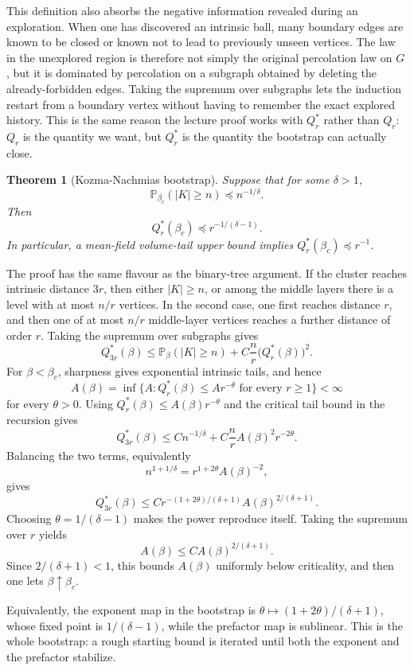 \documentclass[11pt,reqno]{book}
\numberwithin{equation}{chapter}
\theoremstyle{plain}
\newtheorem{theorem}{Theorem}[chapter]
\theoremstyle{definition}
\theoremstyle{remark}
\renewcommand{\P}{\mathbb P}
\newcommand{\1}{\mathbf 1}
\newcommand{\pre}{\preceq}
\begin{document}
This definition also absorbs the negative information revealed during an exploration. When one has discovered an intrinsic ball, many boundary edges are known to be closed or known not to lead to previously unseen vertices. The law in the unexplored region is therefore not simply the original percolation law on \(G\), but it is dominated by percolation on a subgraph obtained by deleting the already-forbidden edges. Taking the supremum over subgraphs lets the induction restart from a boundary vertex without having to remember the exact explored history. This is the same reason the lecture proof works with \(Q_r^*\) rather than \(Q_r\): \(Q_r\) is the quantity we want, but \(Q_r^*\) is the quantity the bootstrap can actually close.

\begin{theorem}[Kozma-Nachmias bootstrap]
Suppose that for some $\delta>1$,
\[
  \P_{\beta_c}(|K|\geq n)\pre n^{-1/\delta}.
\]
Then
\[
  Q_r^*(\beta_c)\pre r^{-1/(\delta-1)}.
\]
In particular, a mean-field volume-tail upper bound implies $Q_r^*(\beta_c)\pre r^{-1}$.
\end{theorem}

The proof has the same flavour as the binary-tree argument. If the cluster reaches intrinsic distance $3r$, then either $|K|\geq n$, or among the middle layers there is a level with at most $n/r$ vertices. In the second case, one first reaches distance $r$, and then one of at most $n/r$ middle-layer vertices reaches a further distance of order $r$. Taking the supremum over subgraphs gives
\[
  Q_{3r}^*(\beta)
  \leq
  \P_\beta(|K|\geq n)
  +
  C\frac nr\bigl(Q_r^*(\beta)\bigr)^2.
\]
For \(\beta<\beta_c\), sharpness gives exponential intrinsic tails, and hence
\[
  A(\beta)=
  \inf\{A:Q_r^*(\beta)\leq Ar^{-\theta}\text{ for every }r\geq1\}
  <\infty
\]
for every \(\theta>0\). Using \(Q_r^*(\beta)\leq A(\beta)r^{-\theta}\) and the critical tail bound in the recursion gives
\[
  Q_{3r}^*(\beta)
  \leq
  Cn^{-1/\delta}
  +
  C\frac nr A(\beta)^2r^{-2\theta}.
\]
Balancing the two terms, equivalently
\[
  n^{1+1/\delta}
  =
  r^{1+2\theta}A(\beta)^{-2},
\]
gives
\[
  Q_{3r}^*(\beta)
  \leq
  C r^{-(1+2\theta)/(\delta+1)}
  A(\beta)^{2/(\delta+1)}.
\]
Choosing $\theta=1/(\delta-1)$ makes the power reproduce itself. Taking the supremum over \(r\) yields
\[
  A(\beta)\leq C A(\beta)^{2/(\delta+1)}.
\]
Since $2/(\delta+1)<1$, this bounds \(A(\beta)\) uniformly below criticality, and then one lets $\beta\uparrow\beta_c$.

Equivalently, the exponent map in the bootstrap is \(\theta\mapsto(1+2\theta)/(\delta+1)\), whose fixed point is \(1/(\delta-1)\), while the prefactor map is sublinear. This is the whole bootstrap: a rough starting bound is iterated until both the exponent and the prefactor stabilize.
\end{document}
